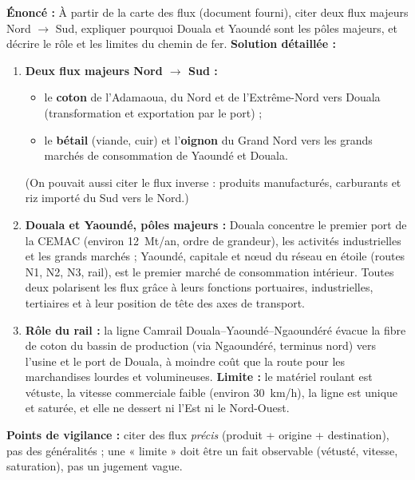 \documentclass[11pt]{article}
\begin{document}
\begin{corrige}
\textbf{Énoncé :} À partir de la carte des flux (document fourni), citer deux flux majeurs Nord $\rightarrow$ Sud, expliquer pourquoi Douala et Yaoundé sont les pôles majeurs, et décrire le rôle et les limites du chemin de fer.
\tcblower
\textbf{Solution détaillée :}
\begin{enumerate}
    \item \textbf{Deux flux majeurs Nord $\rightarrow$ Sud :}
    \begin{itemize}
        \item le \textbf{coton} de l'Adamaoua, du Nord et de l'Extrême-Nord vers Douala (transformation et exportation par le port) ;
        \item le \textbf{bétail} (viande, cuir) et l'\textbf{oignon} du Grand Nord vers les grands marchés de consommation de Yaoundé et Douala.
    \end{itemize}
    (On pouvait aussi citer le flux inverse : produits manufacturés, carburants et riz importé du Sud vers le Nord.)

    \item \textbf{Douala et Yaoundé, pôles majeurs :} Douala concentre le premier port de la CEMAC (environ 12~Mt/an, ordre de grandeur), les activités industrielles et les grands marchés ; Yaoundé, capitale et nœud du réseau en étoile (routes N1, N2, N3, rail), est le premier marché de consommation intérieur. Toutes deux polarisent les flux grâce à leurs fonctions portuaires, industrielles, tertiaires et à leur position de tête des axes de transport.

    \item \textbf{Rôle du rail :} la ligne Camrail Douala--Yaoundé--Ngaoundéré évacue la fibre de coton du bassin de production (via Ngaoundéré, terminus nord) vers l'usine et le port de Douala, à moindre coût que la route pour les marchandises lourdes et volumineuses. \textbf{Limite :} le matériel roulant est vétuste, la vitesse commerciale faible (environ 30~km/h), la ligne est unique et saturée, et elle ne dessert ni l'Est ni le Nord-Ouest.
\end{enumerate}

\textbf{Points de vigilance :} citer des flux \emph{précis} (produit + origine + destination), pas des généralités ; une « limite » doit être un fait observable (vétusté, vitesse, saturation), pas un jugement vague.
\end{corrige}
\end{document}
